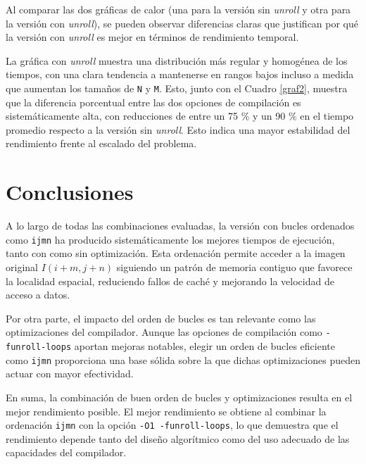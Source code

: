 \documentclass[11pt,a4paper,twoside]{article}
\theoremstyle{definition}
\begin{document}
	Al comparar las dos gráficas de calor (una para la versión sin \textit{unroll} y otra para la versión con \textit{unroll}), se pueden observar diferencias claras que justifican por qué la versión con \textit{unroll} es mejor en términos de rendimiento temporal. 

	La gráfica con \textit{unroll} muestra una distribución más regular y homogénea de los tiempos, con una clara tendencia a mantenerse en rangos bajos incluso a medida que aumentan los tamaños de \texttt{N} y \texttt{M}. Esto, junto con el Cuadro \ref{graf2}, muestra que la diferencia porcentual entre las dos opciones de compilación es sistemáticamente alta, con reducciones de entre un 75 \% y un 90 \% en el tiempo promedio respecto a la versión sin \textit{unroll}. Esto indica una mayor estabilidad del rendimiento frente al escalado del problema.
	
	
	\section{Conclusiones}
	
	A lo largo de todas las combinaciones evaluadas, la versión con bucles ordenados como \texttt{ijmn} ha producido sistemáticamente los mejores tiempos de ejecución, tanto con como sin optimización. Esta ordenación permite acceder a la imagen original $I(i+m, j+n)$ siguiendo un patrón de memoria contiguo que favorece la localidad espacial, reduciendo fallos de caché y mejorando la velocidad de acceso a datos.
	
	Por otra parte, el impacto del orden de bucles es tan relevante como las optimizaciones del compilador.  
	Aunque las opciones de compilación como \texttt{-funroll-loops} aportan mejoras notables, elegir un orden de bucles eficiente como \texttt{ijmn} proporciona una base sólida sobre la que dichas optimizaciones pueden actuar con mayor efectividad.
	
	En suma, la combinación de buen orden de bucles y optimizaciones resulta en el mejor rendimiento posible.  
	El mejor rendimiento se obtiene al combinar la ordenación \texttt{ijmn} con la opción \texttt{-O1 -funroll-loops}, lo que demuestra que el rendimiento depende tanto del diseño algorítmico como del uso adecuado de las capacidades del compilador.


\printbibliography
	
	
\end{document}
